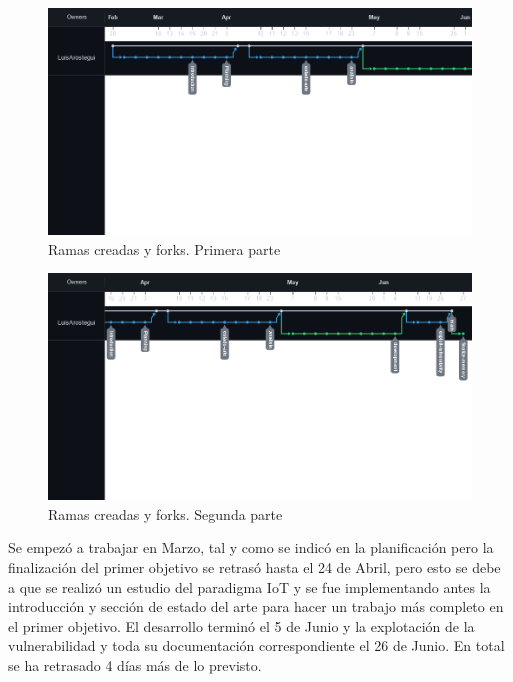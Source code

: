 \begin{figure}[hb!]
    \centering
    \includegraphics[width=\linewidth]{imagenes/canvas.png}
    \caption{Ramas creadas y forks. Primera parte}
    \label{fig:figure5-plan}
\end{figure}

\begin{figure}[ht!]
    \centering
    \includegraphics[width=\linewidth]{imagenes/canvas2.png}
    \caption{Ramas creadas y forks. Segunda parte}
    \label{fig:figure6-plan}
\end{figure}

Se empezó a trabajar en Marzo, tal y como se indicó en la planificación pero la finalización del primer objetivo se retrasó hasta el 24 de Abril, pero esto se debe a que se realizó un estudio del paradigma IoT y se fue implementando antes la introducción y sección de estado del arte para hacer un trabajo más completo en el primer objetivo. El desarrollo terminó el 5 de Junio y la explotación de la vulnerabilidad y toda su documentación correspondiente el 26 de Junio. En total se ha retrasado 4 días más de lo previsto. \\

